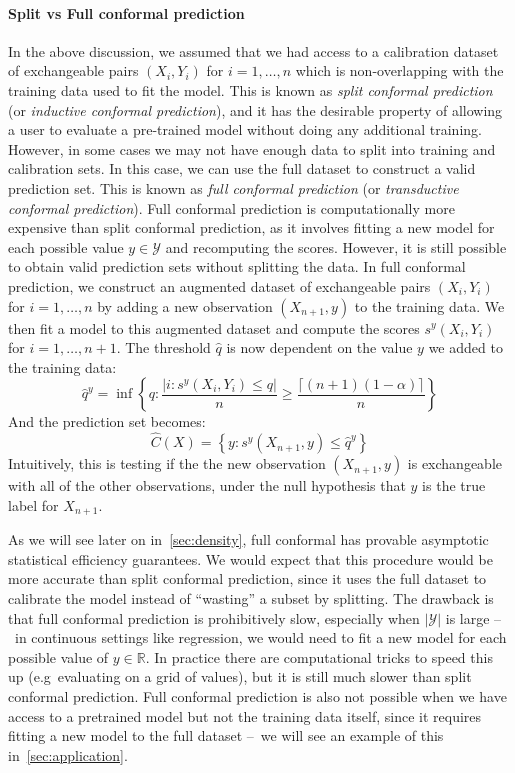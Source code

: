 \documentclass[a4paper, 12pt]{article}
\begin{document}
\paragraph*{Split vs Full conformal prediction} In the above discussion, we assumed that we had access to a calibration dataset of exchangeable pairs $(X_i, Y_i)$ for $i = 1, \ldots, n$ which is non-overlapping with the training data used to fit the model. This is known as \textit{split conformal prediction} (or \textit{inductive conformal prediction}), and it has the desirable property of allowing a user to evaluate a pre-trained model without doing any additional training. However, in some cases we may not have enough data to split into training and calibration sets. In this case, we can use the full dataset to construct a valid prediction set. This is known as \textit{full conformal prediction} (or \textit{transductive conformal prediction}). Full conformal prediction is computationally more expensive than split conformal prediction, as it involves fitting a new model for each possible value $y \in \mathcal{Y}$ and recomputing the scores. However, it is still possible to obtain valid prediction sets without splitting the data. In full conformal prediction, we construct an augmented dataset of exchangeable pairs $(X_i, Y_i)$ for $i = 1, \ldots, n$ by adding a new observation $(X_{n+1}, y)$ to the training data.
We then fit a model to this augmented dataset and compute the scores $s^y(X_i, Y_i)$ for $i = 1, \ldots, n+1$.
The threshold $\hat{q}$ is now dependent on the value $y$ we added to the training data:
\[ \hat{q}^y = \inf \left\{ q: \frac{\left| i : s^y(X_i, Y_i) \leq q \right|}{n} \geq \frac{\lceil (n+1)(1-\alpha) \rceil }{n} \right\} \]
And the prediction set becomes:
\[ \hat{C}(X) = \left\{ y: s^y(X_{n+1}, y) \leq \hat{q}^y \right\} \]
Intuitively, this is testing if the the new observation $(X_{n+1}, y)$ is exchangeable with all of the other observations, under the null hypothesis that $y$ is the true label for $X_{n+1}$.

As we will see later on in~\ref{sec:density}, full conformal has provable asymptotic statistical efficiency guarantees. We would expect that this procedure would be more accurate than split conformal prediction, since it uses the full dataset to calibrate the model instead of ``wasting'' a subset by splitting. The drawback is that full conformal prediction is prohibitively slow, especially when $|\mathcal{Y}|$ is large --\ in continuous settings like regression, we would need to fit a new model for each possible value of $y \in \mathbb{R}$. In practice there are computational tricks to speed this up (e.g\ evaluating on a grid of values), but it is still much slower than split conformal prediction. Full conformal prediction is also not possible when we have access to a pretrained model but not the training data itself, since it requires fitting a new model to the full dataset --\ we will see an example of this in~\ref{sec:application}.
\end{document}
